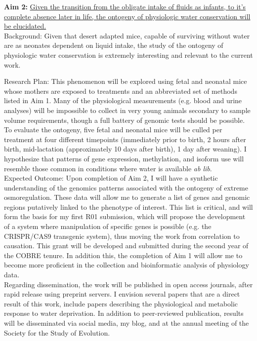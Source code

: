 \documentclass[11pt]{article}
\begin{document}
\noindent \textbf{Aim 2:} \ul{Given the transition from the obligate intake of fluids as infants, to it’s complete absence later in life, the ontogeny of physiologic water conservation will be elucidated.} \\

Background: Given that desert adapted mice, capable of surviving without water are as neonates dependent on liquid intake, {the study of the ontogeny of physiologic water conservation is extremely interesting and relevant to the current work.} 

Research Plan: This phenomenon will be explored using fetal and neonatal mice whose mothers are exposed to treatments and an abbreviated set of methods listed in Aim 1. Many of the physiological measurements  (e.g. blood and urine analyses) will be impossible to collect in very young animals secondary to sample volume requirements, though a full battery of genomic tests should be possible. To evaluate the ontogeny, five fetal and neonatal mice will be culled per treatment at four different timepoints (immediately prior to birth, 2 hours after birth, mid-lactation (approximately 10 days after birth), 1 day after weaning). I hypothesize that patterns of gene expression, methylation, and isoform use will resemble those common in conditions where water is available \textit{ab lib}. \\

Expected Outcome: Upon completion of Aim 2, I will have a synthetic understanding of the genomics patterns associated with the ontogeny of extreme osmoregulation. These data will allow me to generate a list of genes and genomic regions putatively linked to the phenotype of interest. This list is critical, and will form the basis for my first R01 submission, which will propose the development of a system where manipulation of specific genes is possible (e.g. the CRISPR/CAS9 transgenic system), thus moving the work from correlation to causation. This grant will be developed and submitted during the second year of the COBRE tenure. In addition this, the completion of Aim 1 will allow me to become more proficient in the collection and bioinformatic analysis of physiology data. \\

Regarding dissemination, the work will be published in open access journals, after rapid release using preprint servers. I envision several papers that are a direct result of this work, include papers describing the physiological and metabolic response to water deprivation. In addition to peer-reviewed publication, results will be disseminated via social media, my blog, and at the annual meeting of the Society for the Study of Evolution. 
\end{document}
